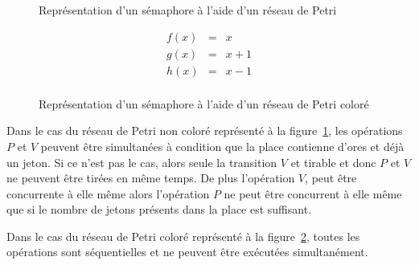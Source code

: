 \begin{figure}
    \begin{center}
    \end{center}
    \caption{Représentation d'un sémaphore à l'aide d'un réseau de Petri}
    \label{exo7fig1}
\end{figure}

    \begin{figure}
\begin{minipage}[c]{0.6\linewidth}
\end{minipage}
\hfill
\begin{minipage}[c]{0.3\linewidth}
    \[
        \begin{array}{rcl}
            f(x) & = & x \\
            g(x) & = & x+1 \\
            h(x) & = & x-1 \\
        \end{array}
    \]
\end{minipage}
        \caption{Représentation d'un sémaphore à l'aide d'un réseau de Petri coloré}
        \label{exo7fig2}
\end{figure}

Dans le cas du réseau de Petri non coloré représenté à la figure~\ref{exo7fig1},
les opérations $P$ et $V$ peuvent être simultanées à condition que la place contienne d'ores et
déjà un jeton. Si ce n'est pas le cas, alors seule la transition $V$ et tirable et donc $P$ et $V$
ne peuvent être tirées en même temps. De plus l'opération $V$, peut être concurrente à elle même
alors l'opération $P$ ne peut être concurrent à elle même que si le nombre de jetons présents dans
la place est suffisant.

Dans le cas du réseau de Petri coloré représenté à la figure~\ref{exo7fig2}, toutes les opérations
sont séquentielles et ne peuvent être exécutées simultanément.
